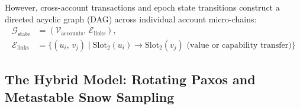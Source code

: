 \documentclass[a4paper,11pt,twoside,parskip=half-,headings=small]{scrartcl}
\begin{document}
However, cross-account transactions and epoch state transitions construct a directed acyclic
graph (DAG) across individual account micro-chains:
\begin{align}
  \mathcal{G}_{\text{state}} &= (\mathcal{V}_{\text{accounts}},\, \mathcal{E}_{\text{links}}), \nonumber\\
  \mathcal{E}_{\text{links}} &= \{ (u_i,\, v_j) \mid \text{Slot}_2(u_i) \to \text{Slot}_2(v_j) \text{ (value or capability transfer)} \}
  \label{eq:state_dag}
\end{align}

\subsection{The Hybrid Model: Rotating Paxos and Metastable Snow Sampling}
\end{document}
